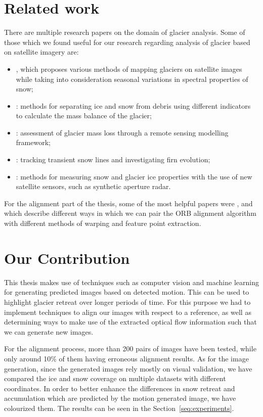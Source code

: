 \documentclass[12pt, a4paper]{report}
\begin{document}
	\section{Related work} 

	\par There are multiple research papers on the domain of glacier analysis. Some of those which we found useful for our research regarding analysis of glacier based on satellite imagery are:
	\begin{itemize}
		\item \cite{rgmuos}, which proposes various methods of mapping glaciers on satellite images while taking into consideration seasonal variations in spectral properties of snow; 
		\item \cite{aaesakh}: methods for separating ice and snow from debris using different indicators to calculate the mass balance of the glacier;
		\item \cite{parvati}: assessment of glacier mass loss through a remote sensing modelling framework;
		\item \cite{sar}: tracking transient snow lines and investigating firn evolution;
		\item \cite{msg}: methods for measuring snow and glacier ice properties with the use of new satellite sensors, such as synthetic aperture radar.
	\end{itemize}

	For the alignment part of the thesis, some of the most helpful papers were \cite{orbsift}, \cite{feorb} and \cite{orblocal} which describe different ways in which we can pair the ORB alignment algorithm with different methods of warping and feature point extraction.

	\section{Our Contribution}
	
	\par This thesis makes use of techniques such as computer vision and machine learning for generating predicted images based on detected motion. This can be used to highlight glacier retreat over longer periods of time. For this purpose we had to implement techniques to align our images with respect to a reference, as well as determining ways to make use of the extracted optical flow information such that we can generate new images.

	\par For the alignment process, more than 200 pairs of images have been tested, while only around 10\% of them having erroneous alignment results. As for the image generation, since the generated images rely mostly on visual validation, we have compared the ice and snow coverage on multiple datasets with different coordinates. In order to better enhance the differences in snow retreat and accumulation which are predicted by the motion generated image, we have colourized them. The results can be seen in the Section~\ref{seq:experiments}. 
	
\end{document}
